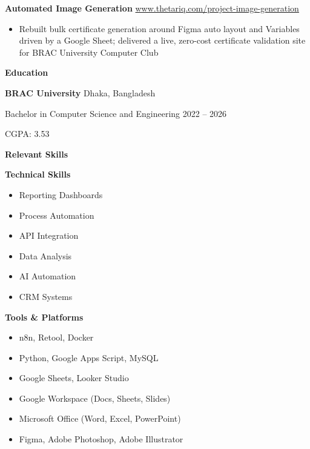 \documentclass[11pt]{article}
\begin{document}
\vspace{3pt}

\textbf{Automated Image Generation} \hfill \href{https://www.thetariq.com/project-image-generation.html}{www.thetariq.com/project-image-generation}
\begin{itemize}[noitemsep, topsep=0pt, partopsep=0pt, parsep=0pt]
    \item Rebuilt bulk certificate generation around Figma auto layout and Variables driven by a Google Sheet; delivered a live, zero-cost certificate validation site for BRAC University Computer Club
\end{itemize}

\vspace{4pt}

\begin{center}
    \textbf{Education}
\end{center}
\textbf{BRAC University} \hfill Dhaka, Bangladesh

Bachelor in Computer Science and Engineering \hfill 2022 -- 2026

CGPA: 3.53

\vspace{4pt}

\begin{center}
    \textbf{Relevant Skills}
\end{center}
\textbf{Technical Skills}
\begin{itemize}
    \item Reporting Dashboards
    \item Process Automation
    \item API Integration
    \item Data Analysis
    \item AI Automation
    \item CRM Systems
\end{itemize}

\textbf{Tools \& Platforms}
\begin{itemize}
    \item n8n, Retool, Docker
    \item Python, Google Apps Script, MySQL
    \item Google Sheets, Looker Studio
    \item Google Workspace (Docs, Sheets, Slides)
    \item Microsoft Office (Word, Excel, PowerPoint)
    \item Figma, Adobe Photoshop, Adobe Illustrator
\end{itemize}
\end{document}
